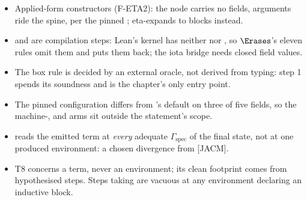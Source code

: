 \begin{itemize}
\item {} Applied-form constructors (F-ETA2): the node carries no fields, arguments ride the
spine, per the pinned ;  eta-expands to blocks instead.
\item {}  and  are compilation steps: Lean's kernel has neither
 nor , so $\Erases$'s eleven rules omit them and  puts them back; the iota bridge needs closed
field values.
\item {} The box rule is decided by an external oracle, not derived from typing: step 1
spends its soundness and is the chapter's only  entry point.
\item {} The pinned configuration differs from 's default on three of five
fields, so the machine-,  and  arms sit outside the statement's
scope.
\item {}  reads the emitted term at \emph{every} adequate
$\Gamma_{\mathrm{spec}}$ of the final state, not at one produced environment: a chosen divergence from
[JACM].
\item {} T8 concerns a term, never an environment; its clean footprint comes from hypothesised
steps. Steps taking  are vacuous at any environment declaring an inductive block.
\end{itemize}
